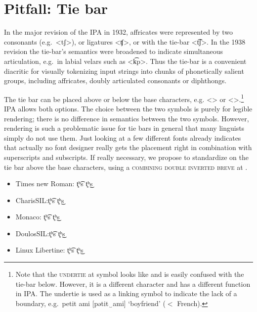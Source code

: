 

\section{Pitfall: Tie bar}
\label{pitfall-tie-bar}


In the major revision of the IPA in 1932, affricates were represented by two consonants 
(e.g.\ <tʃ>), or ligatures <ʧ>, or with the tie-bar <t͡ʃ>. In the 1938 revision the tie-bar's 
semantics were broadened to indicate simultaneous articulation, e.g.\ in labial velars 
such as <k͡p>. Thus the tie-bar is a convenient diacritic for visually tokenizing input 
strings into chunks of phonetically salient groups, including affricates, doubly articulated 
consonants or diphthongs. 

The tie bar can be placed above or below the base characters, e.g. <>
or <>.\footnote{Note that the \textsc{undertie} at  symbol 
looks like and is easily confused with the tie-bar below. However, it is a different 
character and has a different function in IPA. The undertie is used as a linking 
symbol to indicate the lack of a boundary, e.g.\ petit ami [pətit‿ami] `boyfriend' 
($<$ French).} IPA allows both options. The choice between the two symbols
is purely for legible rendering; there is no difference in semantics between the
two symbols. However, rendering is such a problematic issue for tie bars in
general that many linguists simply do not use them. Just looking at a few
different fonts already indicates that actually no font designer really gets the
placement right in combination with superscripts and subscripts. If really
necessary, we propose to standardize on the tie bar above the base characters,
using a \textsc{combining double inverted breve} at .

\begin{itemize}[itemsep=6pt]
  \item[] {Times new Roman: t̥ʰ͡s t̥ʰ͜s}
  \item[] {\small {}CharisSIL:\@ t̥ʰ͡s t̥ʰ͜s}
  \item[] {\footnotesize {}Monaco: t̥ʰ͡s t̥ʰ͜s}
  \item[] {DoulosSIL:\@ t̥ʰ͡s t̥ʰ͜s}
  \item[] Linux Libertine: t̥ʰ͡s t̥ʰ͜s
\end{itemize}

